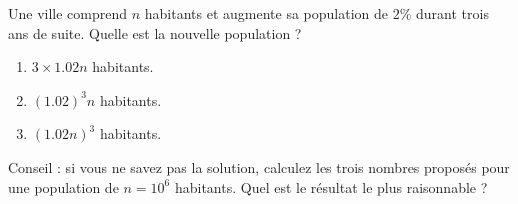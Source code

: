 
\begin{exercice}\label{exoPremiere-0017}

        Une ville comprend \( n\) habitants et augmente sa population de \( 2\%\) durant trois ans de suite. Quelle est la nouvelle population ?
        \begin{enumerate}
            \item
                \( 3\times 1.02n\) habitants.
            \item
                \( (1.02)^3n\) habitants.
            \item
                \( (1.02n)^3\) habitants.
        \end{enumerate}
        Conseil : si vous ne savez pas la solution, calculez les trois nombres proposés pour une population de \( n=10^6\) habitants. Quel est le résultat le plus raisonnable ?

\end{exercice}
